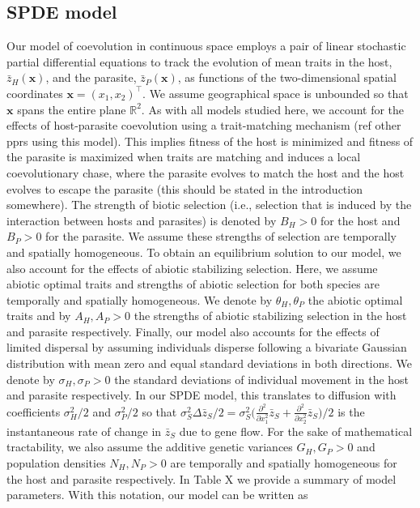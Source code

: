\documentclass{article}
\begin{document}
\hypertarget{spde-model}{%
\subsection{\texorpdfstring{SPDE model
\label{spde}}{SPDE model }}\label{spde-model}}

Our model of coevolution in continuous space employs a pair of linear
stochastic partial differential equations to track the evolution of mean
traits in the host, \(\bar z_H(\pmb x)\), and the parasite,
\(\bar z_P(\pmb x)\), as functions of the two-dimensional spatial
coordinates \(\pmb x=(x_1,x_2)^\top\). We assume geographical space is
unbounded so that \(\pmb x\) spans the entire plane \(\mathbb R^2\). As
with all models studied here, we account for the effects of
host-parasite coevolution using a trait-matching mechanism (ref other
pprs using this model). This implies fitness of the host is minimized
and fitness of the parasite is maximized when traits are matching and
induces a local coevolutionary chase, where the parasite evolves to
match the host and the host evolves to escape the parasite (this should
be stated in the introduction somewhere). The strength of biotic
selection (i.e., selection that is induced by the interaction between
hosts and parasites) is denoted by \(B_H>0\) for the host and \(B_P>0\)
for the parasite. We assume these strengths of selection are temporally
and spatially homogeneous. To obtain an equilibrium solution to our
model, we also account for the effects of abiotic stabilizing selection.
Here, we assume abiotic optimal traits and strengths of abiotic
selection for both species are temporally and spatially homogeneous. We
denote by \(\theta_H,\theta_P\) the abiotic optimal traits and by
\(A_H,A_P>0\) the strengths of abiotic stabilizing selection in the host
and parasite respectively. Finally, our model also accounts for the
effects of limited dispersal by assuming individuals disperse following
a bivariate Gaussian distribution with mean zero and equal standard
deviations in both directions. We denote by \(\sigma_H,\sigma_P>0\) the
standard deviations of individual movement in the host and parasite
respectively. In our SPDE model, this translates to diffusion with
coefficients \(\sigma_H^2/2\) and \(\sigma_P^2/2\) so that
\(\sigma_S^2\Delta\bar z_S/2=\sigma_S^2\big(\tfrac{\partial^2}{\partial x_1^2}\bar z_S+\tfrac{\partial^2}{\partial x_2^2}\bar z_S\big)/2\)
is the instantaneous rate of change in \(\bar z_S\) due to gene flow.
For the sake of mathematical tractability, we also assume the additive
genetic variances \(G_H,G_P>0\) and population densities \(N_H,N_P>0\)
are temporally and spatially homogeneous for the host and parasite
respectively. In Table X we provide a summary of model parameters. With
this notation, our model can be written as
\end{document}
